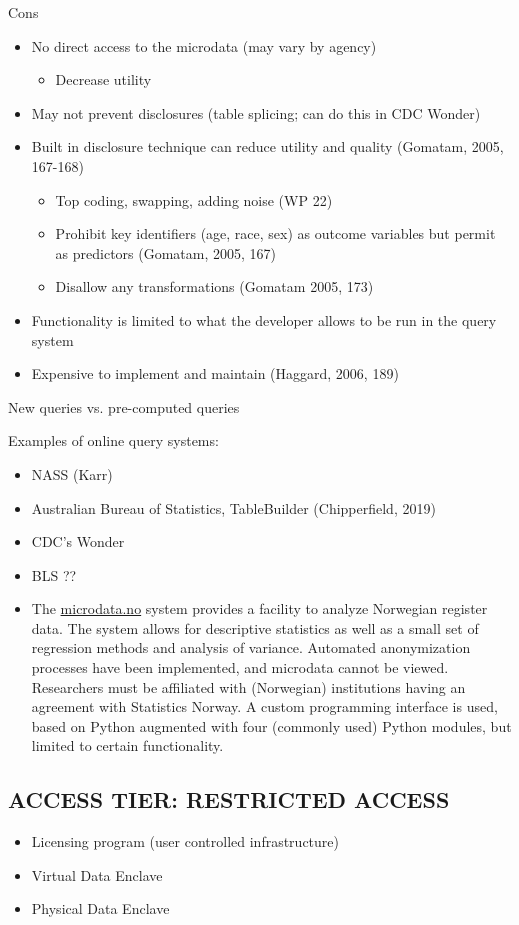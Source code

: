Cons 
\begin{itemize}
\item 	No direct access to the microdata (may vary by agency)
\begin{itemize}
    \item 	Decrease utility
\end{itemize}
\item 	May not prevent disclosures (table splicing; can do this in CDC Wonder) 
\item 	Built in disclosure technique can reduce utility and quality (Gomatam, 2005, 167-168)
\begin{itemize}
    \item Top coding, swapping, adding noise (WP 22)
    \item Prohibit key identifiers (age, race, sex) as outcome variables but permit as predictors (Gomatam, 2005, 167)
    \item Disallow any transformations (Gomatam 2005, 173)
\end{itemize}
\item 	Functionality is limited to what the developer allows to be run in the query system
\item 	Expensive to implement and maintain (Haggard, 2006, 189)
\end{itemize}

New queries vs. pre-computed queries 

Examples of online query systems: 
\begin{itemize}
\item 	NASS (Karr)
\item 	Australian Bureau of Statistics, TableBuilder (Chipperfield, 2019)
\item 	CDC’s Wonder
\item 	BLS ??
\item The \href{https://microdata.no}{microdata.no} system provides a facility to analyze Norwegian register data. The system allows for descriptive statistics as well as a small set of regression methods and  analysis of variance. Automated anonymization processes have been implemented, and microdata cannot be viewed. Researchers must be affiliated with (Norwegian) institutions having an agreement with Statistics Norway. A custom programming interface is used, based on Python augmented with four (commonly used) Python modules, but limited to certain functionality. 
\end{itemize}

\subsection{ACCESS TIER: RESTRICTED ACCESS}
\begin{itemize}
\item{Licensing program} (user controlled infrastructure)
\item{Virtual Data Enclave}
\item{Physical Data Enclave}
\end{itemize}

